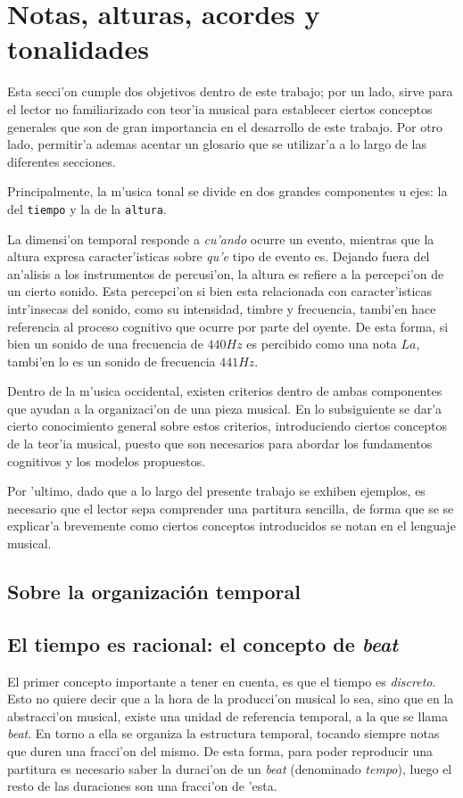 \section{Notas, alturas, acordes y tonalidades}
\label{sec_cogn_bg}
Esta secci'on cumple dos objetivos dentro de este trabajo; por un lado, sirve para el lector no familiarizado con teor'ia musical para establecer
ciertos conceptos generales que son de gran importancia en el desarrollo de este trabajo. Por otro lado, permitir'a ademas acentar un glosario
que se utilizar'a a lo largo de las diferentes secciones.

Principalmente, la m'usica tonal se divide en dos grandes componentes u ejes: la del \texttt{tiempo} y la de la \texttt{altura}. 

La dimensi'on temporal responde a \emph{cu'ando} ocurre un evento, mientras que la altura expresa caracter'isticas sobre \emph{qu'e}
tipo de evento es.  Dejando fuera del an'alisis a los instrumentos de percusi'on, la altura es refiere a la percepci'on de un cierto sonido. 
Esta percepci'on si bien esta relacionada con caracter'isticas intr'insecas del sonido, como su intensidad, timbre y frecuencia, 
tambi'en hace referencia
al proceso cognitivo que ocurre por parte del oyente. De esta forma, si bien un sonido de una frecuencia de $440Hz$ es percibido como una nota 
$La$, tambi'en lo es un sonido de frecuencia $441Hz$.

Dentro de la m'usica occidental, existen criterios dentro de ambas componentes que ayudan a la organizaci'on de una pieza musical. 
En lo subsiguiente se dar'a cierto conocimiento general sobre estos criterios, introduciendo ciertos conceptos de la teor'ia musical, puesto que son necesarios
para abordar los fundamentos cognitivos y los modelos propuestos. 

Por 'ultimo, dado que a lo largo del presente trabajo se exhiben ejemplos, es necesario que el lector sepa comprender una partitura sencilla, de forma que se se 
explicar'a brevemente como ciertos conceptos introducidos se notan en el lenguaje musical.

\subsection{Sobre la organizaci\'on temporal}
\subsection{El tiempo es racional: el concepto de \emph{beat}}
El primer concepto importante a tener en cuenta, es que el tiempo es \emph{discreto}. Esto no quiere decir que a la hora de la producci'on musical lo sea, sino que 
en la abstracci'on musical, existe una unidad de referencia temporal, a la que se llama \emph{beat}. En torno a ella se organiza la estructura temporal, tocando
siempre notas que duren una fracci'on del mismo. De esta forma, para poder reproducir una partitura es necesario saber la duraci'on de un \emph{beat} (denominado
\emph{tempo}), luego el resto de las duraciones son una fracci'on de 'esta.


